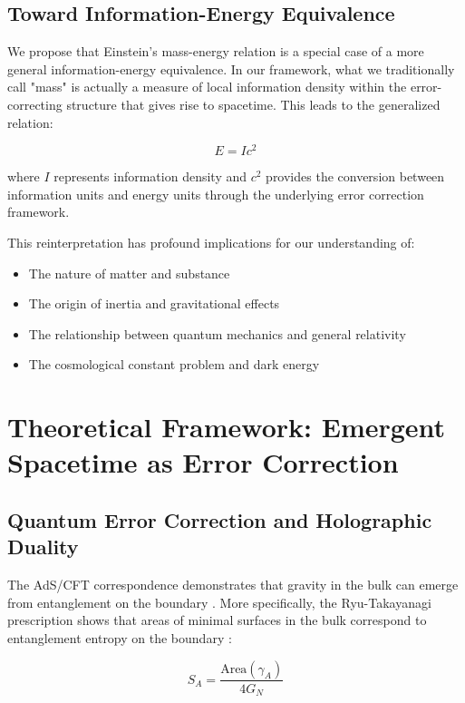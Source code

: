 \documentclass[12pt]{article}
\begin{document}
\subsection{Toward Information-Energy Equivalence}

We propose that Einstein's mass-energy relation is a special case of a more general information-energy equivalence. In our framework, what we traditionally call "mass" is actually a measure of local information density within the error-correcting structure that gives rise to spacetime. This leads to the generalized relation:

\begin{equation}
E = Ic^2
\end{equation}

where $I$ represents information density and $c^2$ provides the conversion between information units and energy units through the underlying error correction framework.

This reinterpretation has profound implications for our understanding of:
\begin{itemize}
\item The nature of matter and substance
\item The origin of inertia and gravitational effects  
\item The relationship between quantum mechanics and general relativity
\item The cosmological constant problem and dark energy
\end{itemize}

\section{Theoretical Framework: Emergent Spacetime as Error Correction}

\subsection{Quantum Error Correction and Holographic Duality}

The AdS/CFT correspondence demonstrates that gravity in the bulk can emerge from entanglement on the boundary \cite{Maldacena1998}. More specifically, the Ryu-Takayanagi prescription shows that areas of minimal surfaces in the bulk correspond to entanglement entropy on the boundary \cite{Ryu2006}:

\begin{equation}
S_A = \frac{\text{Area}(\gamma_A)}{4G_N}
\end{equation}
\end{document}
